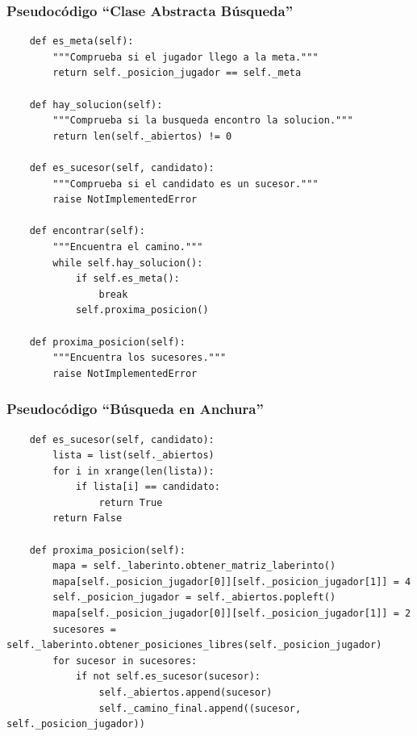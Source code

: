 \documentclass[letter, titlepage, 10pt]{article}
\begin{document}
\subsubsection{Pseudocódigo ``Clase Abstracta Búsqueda''}
\begin{lstlisting}
    def es_meta(self):
        """Comprueba si el jugador llego a la meta."""
        return self._posicion_jugador == self._meta

    def hay_solucion(self):
        """Comprueba si la busqueda encontro la solucion."""
        return len(self._abiertos) != 0
    
    def es_sucesor(self, candidato):
        """Comprueba si el candidato es un sucesor."""
        raise NotImplementedError
    
    def encontrar(self):
        """Encuentra el camino."""
        while self.hay_solucion():
            if self.es_meta():
                break
            self.proxima_posicion()
    
    def proxima_posicion(self):
        """Encuentra los sucesores."""
        raise NotImplementedError
\end{lstlisting}


\subsubsection{Pseudocódigo ``Búsqueda en Anchura''}
\begin{lstlisting}
    def es_sucesor(self, candidato):
        lista = list(self._abiertos)
        for i in xrange(len(lista)):
            if lista[i] == candidato:
                return True
        return False

    def proxima_posicion(self):
        mapa = self._laberinto.obtener_matriz_laberinto()
        mapa[self._posicion_jugador[0]][self._posicion_jugador[1]] = 4
        self._posicion_jugador = self._abiertos.popleft()
        mapa[self._posicion_jugador[0]][self._posicion_jugador[1]] = 2
        sucesores = self._laberinto.obtener_posiciones_libres(self._posicion_jugador)
        for sucesor in sucesores:
            if not self.es_sucesor(sucesor):
                self._abiertos.append(sucesor)
                self._camino_final.append((sucesor, self._posicion_jugador))
\end{lstlisting}
\end{document}
